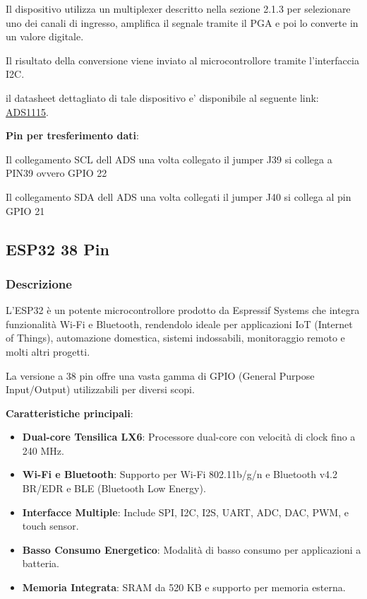 \documentclass[12pt,a4paper]{report}
\begin{document}
Il dispositivo utilizza un multiplexer descritto nella sezione  2.1.3  per selezionare uno dei canali di ingresso, amplifica il segnale tramite il PGA e poi lo converte in un valore digitale. 

Il risultato della conversione viene inviato al microcontrollore tramite l'interfaccia I2C.

il datasheet dettagliato di tale dispositivo e' disponibile al seguente link: \href{https://www.ti.com/lit/ds/symlink/ads1115.pdf}{ADS1115}.

\textbf{Pin per tresferimento dati}:

Il collegamento SCL dell ADS una volta collegato il jumper J39 si collega a PIN39 ovvero GPIO 22 

Il collegamento SDA dell ADS una volta collegati il jumper J40 si collega al pin GPIO 21

\newpage
\subsection{ESP32 38 Pin}
\subsubsection{Descrizione}
L'ESP32 è un potente microcontrollore prodotto da Espressif Systems che integra funzionalità Wi-Fi e Bluetooth, rendendolo ideale per applicazioni IoT (Internet of Things), automazione domestica, sistemi indossabili, monitoraggio remoto e molti altri progetti. 

La versione a 38 pin offre una vasta gamma di GPIO (General Purpose Input/Output) utilizzabili per diversi scopi.

\textbf{Caratteristiche principali}:
\begin{itemize}
    \item \textbf{Dual-core Tensilica LX6}: Processore dual-core con velocità di clock fino a 240 MHz.
    \item \textbf{Wi-Fi e Bluetooth}: Supporto per Wi-Fi 802.11b/g/n e Bluetooth v4.2 BR/EDR e BLE (Bluetooth Low Energy).
    \item \textbf{Interfacce Multiple}: Include SPI, I2C, I2S, UART, ADC, DAC, PWM, e touch sensor.
    \item \textbf{Basso Consumo Energetico}: Modalità di basso consumo per applicazioni a batteria.
    \item \textbf{Memoria Integrata}: SRAM da 520 KB e supporto per memoria esterna.
\end{itemize}
\end{document}
